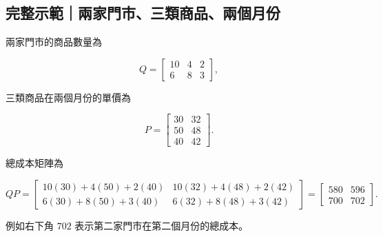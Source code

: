 \documentclass[11pt,a4paper]{article}
\begin{document}
\begin{HandoutWorkedExample}

\subsection{完整示範｜兩家門市、三類商品、兩個月份}\label{ux5b8cux6574ux793aux7bc4ux5169ux5bb6ux9580ux5e02ux4e09ux985eux5546ux54c1ux5169ux500bux6708ux4efd}

兩家門市的商品數量為

\[
Q=
\begin{bmatrix}
10&4&2\\
6&8&3
\end{bmatrix},
\]

三類商品在兩個月份的單價為

\[
P=
\begin{bmatrix}
30&32\\
50&48\\
40&42
\end{bmatrix}.
\]

總成本矩陣為

\[
QP=
\begin{bmatrix}
10(30)+4(50)+2(40)&10(32)+4(48)+2(42)\\
6(30)+8(50)+3(40)&6(32)+8(48)+3(42)
\end{bmatrix}
=
\boxed{\begin{bmatrix}580&596\\700&702\end{bmatrix}}.
\]

例如右下角 \(702\) 表示第二家門市在第二個月份的總成本。

\end{HandoutWorkedExample}

\clearpage
\end{document}
